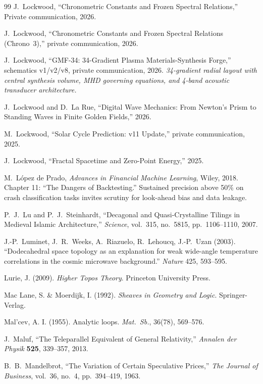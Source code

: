 \documentclass[12pt,oneside]{book}
\theoremstyle{principia}
\theoremstyle{definition}
\theoremstyle{remark}
\begin{document}
\begin{thebibliography}{99}
J.~Lockwood,
``Chronometric Constants and Frozen Spectral Relations,''
Private communication, 2026.

J.~Lockwood, ``Chronometric Constants and Frozen Spectral Relations (Chrono~3),'' private communication, 2026.

J.~Lockwood,
``GMF-34: 34-Gradient Plasma Materials-Synthesis Forge,''
schematics v1/v2/v8, private communication, 2026.
\textit{34-gradient radial layout with central synthesis volume, MHD governing equations, and 4-band acoustic transducer architecture.}

J.~Lockwood and D.~La Rue,
``Digital Wave Mechanics: From Newton's Prism to Standing Waves
in Finite Golden Fields,'' 2026.

M.~Lockwood, ``Solar Cycle Prediction: v11 Update,'' private communication, 2025.

J.~Lockwood,
``Fractal Spacetime and Zero-Point Energy,'' 2025.

M.~L\'{o}pez de Prado,
\emph{Advances in Financial Machine Learning},
Wiley, 2018.
Chapter 11: ``The Dangers of Backtesting.'' Sustained precision above 50\% on crash classification tasks invites scrutiny for look-ahead bias and data leakage.

P.~J.~Lu and P.~J.~Steinhardt,
``Decagonal and Quasi-Crystalline Tilings in Medieval Islamic Architecture,''
\emph{Science}, vol.~315, no.~5815, pp.~1106--1110, 2007.

J.-P.~Luminet, J.~R.~Weeks, A.~Riazuelo, R.~Lehoucq, J.-P.~Uzan (2003).
``Dodecahedral space topology as an explanation for weak wide-angle temperature correlations in the cosmic microwave background.''
\textit{Nature} 425, 593--595.

Lurie, J. (2009). \emph{Higher Topos Theory}. Princeton University Press.

Mac Lane, S. \& Moerdijk, I. (1992). \emph{Sheaves in Geometry and Logic}. Springer-Verlag.

Mal'cev, A. I. (1955). Analytic loops. \emph{Mat.\ Sb.}, 36(78), 569--576.

J.~Maluf, ``The Teleparallel Equivalent of General Relativity,'' \emph{Annalen der Physik} \textbf{525}, 339--357, 2013.

B.~B.~Mandelbrot,
``The Variation of Certain Speculative Prices,''
\emph{The Journal of Business}, vol.~36, no.~4, pp.~394--419, 1963.


\end{thebibliography}
\end{document}
